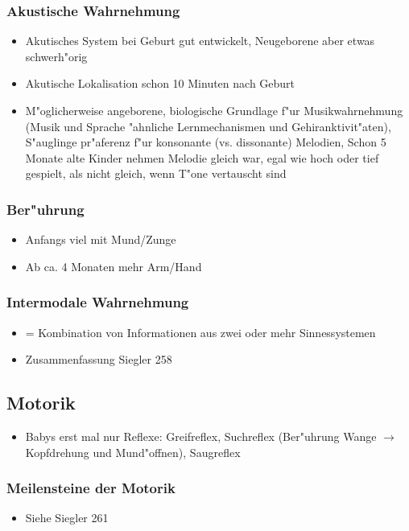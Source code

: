 \subsubsection{Akustische Wahrnehmung}
\begin{itemize}
	\item
		Akutisches System bei Geburt gut entwickelt, Neugeborene aber etwas schwerh"orig
	\item
		Akutische Lokalisation schon 10 Minuten nach Geburt
	\item
		M"oglicherweise angeborene, biologische Grundlage f"ur Musikwahrnehmung (Musik und Sprache "ahnliche Lernmechanismen und Gehiranktivit"aten), S"auglinge pr"aferenz f"ur konsonante (vs. dissonante) Melodien, Schon 5 Monate alte Kinder nehmen Melodie gleich war, egal wie hoch oder tief gespielt, als nicht gleich, wenn T"one vertauscht sind
\end{itemize}

\subsubsection{Ber"uhrung}
\begin{itemize}
	\item
		Anfangs viel mit Mund/Zunge
	\item
		Ab ca. 4 Monaten mehr Arm/Hand
\end{itemize}

\subsubsection{Intermodale Wahrnehmung}
\begin{itemize}
	\item
		= Kombination von Informationen aus zwei oder mehr Sinnessystemen
	\item
		Zusammenfassung Siegler 258
\end{itemize}

\subsection{Motorik}
\begin{itemize}
	\item
		Babys erst mal nur Reflexe: Greifreflex, Suchreflex (Ber"uhrung Wange $\rightarrow$ Kopfdrehung und Mund"offnen), Saugreflex
\end{itemize}
\subsubsection{Meilensteine der Motorik}
\begin{itemize}
	\item
		Siehe Siegler 261
\end{itemize}


